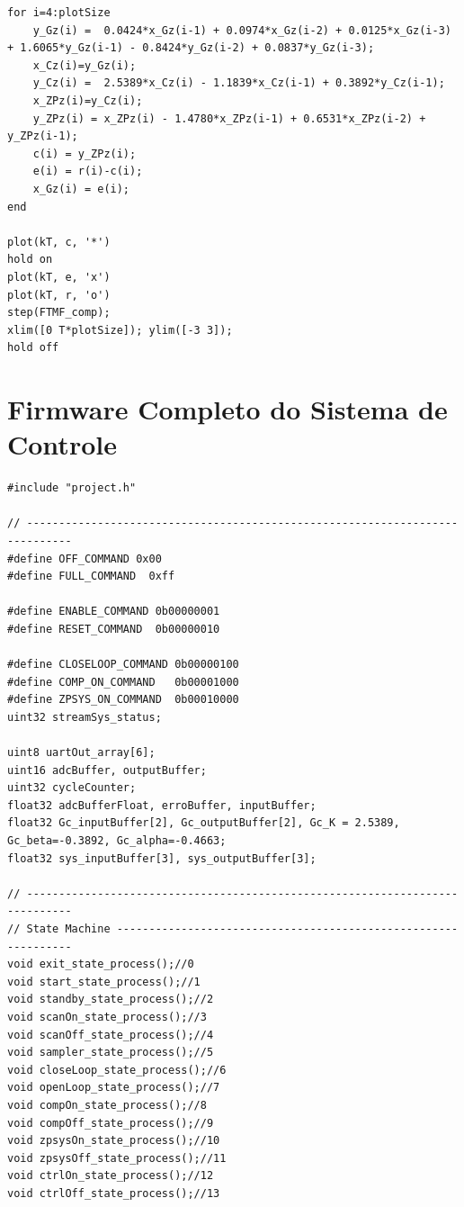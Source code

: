 \documentclass[
	article,			%
	11pt,				%
	oneside,			%
	a4paper,			%
	english,			%
	brazil,				%
	sumario=tradicional
	]{abntex2}
\begin{document}
\begin{apendicesenv}
\begin{lstlisting}
for i=4:plotSize   
    y_Gz(i) =  0.0424*x_Gz(i-1) + 0.0974*x_Gz(i-2) + 0.0125*x_Gz(i-3) + 1.6065*y_Gz(i-1) - 0.8424*y_Gz(i-2) + 0.0837*y_Gz(i-3);       
    x_Cz(i)=y_Gz(i);   
    y_Cz(i) =  2.5389*x_Cz(i) - 1.1839*x_Cz(i-1) + 0.3892*y_Cz(i-1);    
    x_ZPz(i)=y_Cz(i);     
    y_ZPz(i) = x_ZPz(i) - 1.4780*x_ZPz(i-1) + 0.6531*x_ZPz(i-2) + y_ZPz(i-1);
    c(i) = y_ZPz(i);
    e(i) = r(i)-c(i);    
    x_Gz(i) = e(i);
end

plot(kT, c, '*')
hold on
plot(kT, e, 'x')
plot(kT, r, 'o')
step(FTMF_comp);
xlim([0 T*plotSize]); ylim([-3 3]);
hold off
\end{lstlisting}

\pagebreak

\chapter{Firmware Completo do Sistema de Controle}
	\label{app:FirmwareCompleto}
	
	\lstset{language=C}
	\begin{lstlisting}
#include "project.h"

// -----------------------------------------------------------------------------
#define OFF_COMMAND 0x00
#define FULL_COMMAND  0xff

#define ENABLE_COMMAND 0b00000001 
#define RESET_COMMAND  0b00000010

#define CLOSELOOP_COMMAND 0b00000100
#define COMP_ON_COMMAND   0b00001000
#define ZPSYS_ON_COMMAND  0b00010000
uint32 streamSys_status;

uint8 uartOut_array[6];
uint16 adcBuffer, outputBuffer;
uint32 cycleCounter;
float32 adcBufferFloat, erroBuffer, inputBuffer;
float32 Gc_inputBuffer[2], Gc_outputBuffer[2], Gc_K = 2.5389, Gc_beta=-0.3892, Gc_alpha=-0.4663;
float32 sys_inputBuffer[3], sys_outputBuffer[3];

// -----------------------------------------------------------------------------
// State Machine ---------------------------------------------------------------
void exit_state_process();//0
void start_state_process();//1
void standby_state_process();//2
void scanOn_state_process();//3
void scanOff_state_process();//4
void sampler_state_process();//5
void closeLoop_state_process();//6
void openLoop_state_process();//7
void compOn_state_process();//8
void compOff_state_process();//9
void zpsysOn_state_process();//10
void zpsysOff_state_process();//11
void ctrlOn_state_process();//12
void ctrlOff_state_process();//13


\end{lstlisting}
\end{apendicesenv}
\end{document}
